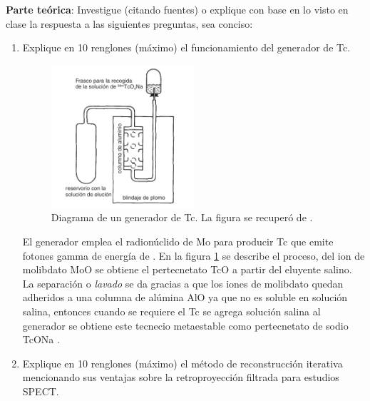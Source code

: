 \newlength{\strutheight}
\settoheight{\strutheight}{\strut}


\textbf{Parte teórica}: Investigue (citando fuentes) o explique con base en lo visto en clase la respuesta a las siguientes preguntas, sea conciso:

\begin{enumerate}[1.]
  \item Explique en 10 renglones (máximo) el funcionamiento del generador de Tc.
  
  \begin{figure}[!ht]
    \centering
    \includegraphics[width=0.5\textwidth]{./figuras/tc_gen.pdf}
    \caption{Diagrama de un generador de Tc. La figura se recuperó de \citet{andre}.}
    \label{p1:tc_gen}
    \end{figure}


El generador emplea el radionúclido de Mo para producir Tc que emite fotones gamma de energía de .  En la figura \ref{p1:tc_gen} se describe el proceso, del ion de molibdato MoO se obtiene el pertecnetato TcO a partir del eluyente salino. La separación o \textit{lavado} se da gracias a que los iones de molibdato quedan adheridos a una columna de alúmina AlO ya que no es soluble en solución salina, entonces cuando se requiere el Tc se agrega solución salina al generador se obtiene este tecnecio metaestable como pertecnetato de sodio TcONa \citep{guy,IM}.







  \item Explique en 10 renglones (máximo) el método de reconstrucción iterativa mencionando sus ventajas sobre la retroproyección filtrada para estudios SPECT.
  

\end{enumerate}
